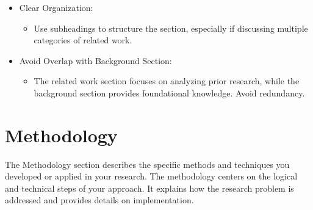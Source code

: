 \documentclass[conference]{IEEEtran}
\begin{document}
\begin{itemize}
\item Clear Organization:  
\begin{itemize}
   \item Use subheadings to structure the section, especially if discussing multiple categories of related work.  
\end{itemize}
\end{itemize}

\begin{itemize}
\item Avoid Overlap with Background Section:  
\begin{itemize}
   \item The related work section focuses on analyzing prior research, while the background section provides foundational knowledge. Avoid redundancy.
\end{itemize}
\end{itemize}

\section{Methodology}\label{sec:method}
The Methodology section describes the specific methods and techniques you developed or applied in your research. The methodology centers on the logical and technical steps of your approach. It explains how the research problem is addressed and provides details on implementation.  
\end{document}

